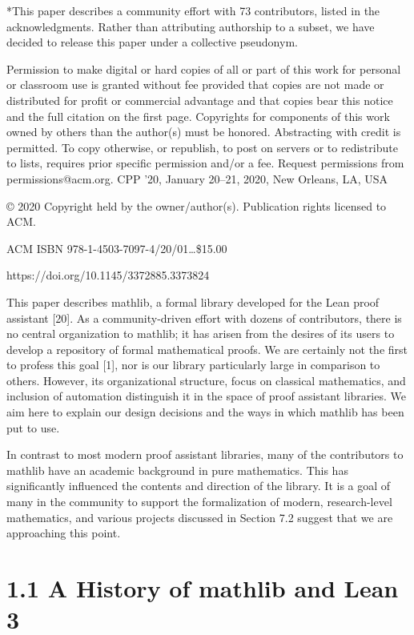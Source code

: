 \documentclass[
]{article}
\begin{document}
*This paper describes a community effort with 73 contributors, listed in
the acknowledgments. Rather than attributing authorship to a subset, we
have decided to release this paper under a collective pseudonym.

Permission to make digital or hard copies of all or part of this work
for personal or classroom use is granted without fee provided that
copies are not made or distributed for profit or commercial advantage
and that copies bear this notice and the full citation on the first
page. Copyrights for components of this work owned by others than the
author(s) must be honored. Abstracting with credit is permitted. To copy
otherwise, or republish, to post on servers or to redistribute to lists,
requires prior specific permission and/or a fee. Request permissions
from permissions@acm.org. CPP '20, January 20--21, 2020, New Orleans,
LA, USA

© 2020 Copyright held by the owner/author(s). Publication rights
licensed to ACM.

ACM ISBN 978-1-4503-7097-4/20/01\ldots\$15.00

https://doi.org/10.1145/3372885.3373824

This paper describes mathlib, a formal library developed for the Lean
proof assistant {[}20{]}. As a community-driven effort with dozens of
contributors, there is no central organization to mathlib; it has arisen
from the desires of its users to develop a repository of formal
mathematical proofs. We are certainly not the first to profess this goal
{[}1{]}, nor is our library particularly large in comparison to others.
However, its organizational structure, focus on classical mathematics,
and inclusion of automation distinguish it in the space of proof
assistant libraries. We aim here to explain our design decisions and the
ways in which mathlib has been put to use.

In contrast to most modern proof assistant libraries, many of the
contributors to mathlib have an academic background in pure mathematics.
This has significantly influenced the contents and direction of the
library. It is a goal of many in the community to support the
formalization of modern, research-level mathematics, and various
projects discussed in Section 7.2 suggest that we are approaching this
point.

\section{1.1 A History of mathlib and Lean
3}\label{a-history-of-mathlib-and-lean-3}
\end{document}

